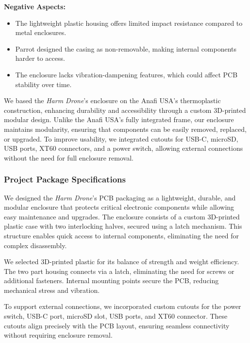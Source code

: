 \documentclass[12pt]{article}
\begin{document}
\textbf{Negative Aspects:}
\begin{itemize}
    \item The lightweight plastic housing offers limited impact resistance compared to metal enclosures.
    \item Parrot designed the casing as non-removable, making internal components harder to access.
    \item The enclosure lacks vibration-dampening features, which could affect PCB stability over time.
\end{itemize}

\par We based the \textit{Harm Drone}’s enclosure on the Anafi USA’s thermoplastic construction, enhancing durability and accessibility through a custom 3D-printed modular design. Unlike the Anafi USA’s fully integrated frame, our enclosure maintains modularity, ensuring that components can be easily removed, replaced, or upgraded. To improve usability, we integrated cutouts for USB-C, microSD, USB ports, XT60 connectors, and a power switch, allowing external connections without the need for full enclosure removal.

\subsubsection{Project Package Specifications}

\par We designed the \textit{Harm Drone}’s PCB packaging as a lightweight, durable, and modular enclosure that protects critical electronic components while allowing easy maintenance and upgrades. The enclosure consists of a custom 3D-printed plastic case with two interlocking halves, secured using a latch mechanism. This structure enables quick access to internal components, eliminating the need for complex disassembly.

\par We selected 3D-printed plastic for its balance of strength and weight efficiency. The two part housing connects via a latch, eliminating the need for screws or additional fasteners. Internal mounting points secure the PCB, reducing mechanical stress and vibration.

\par To support external connections, we incorporated custom cutouts for the power switch, USB-C port, microSD slot, USB ports, and XT60 connector. These cutouts align precisely with the PCB layout, ensuring seamless connectivity without requiring enclosure removal.
\end{document}
